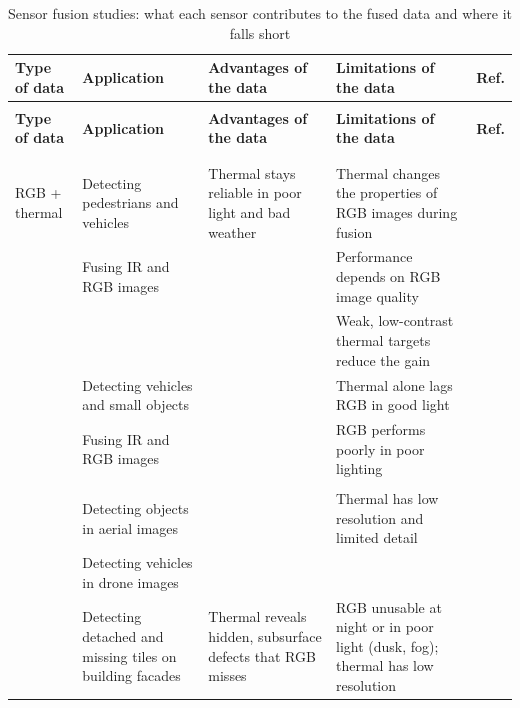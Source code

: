 {\scriptsize
\renewcommand{\arraystretch}{1.15}
\setlength{\tabcolsep}{3pt}
\begin{xltabular}{\textwidth}{>{\RaggedRight\arraybackslash}p{2.1cm}>{\RaggedRight\arraybackslash}p{2.9cm}>{\RaggedRight\arraybackslash}X>{\RaggedRight\arraybackslash}Xp{0.95cm}}
\caption{Sensor fusion studies: what each sensor contributes to the fused data and where it falls short}\label{tab:fusion-data}\\
\toprule
\textbf{Type of data} & \textbf{Application} & \textbf{Advantages of the data} & \textbf{Limitations of the data} & \textbf{Ref.} \\
\midrule
\endfirsthead
{}\\
\toprule
\textbf{Type of data} & \textbf{Application} & \textbf{Advantages of the data} & \textbf{Limitations of the data} & \textbf{Ref.} \\
\midrule
\endhead
\midrule{}\\
\endfoot
\bottomrule
{}\\
\endlastfoot
RGB + thermal & Detecting pedestrians and vehicles & Thermal stays reliable in poor light and bad weather & Thermal changes the properties of RGB images during fusion & \citep{Lin2022} \\
 & Fusing IR and RGB images &  & Performance depends on RGB image quality & \citep{Xiao2026} \\
 &  &  & Weak, low-contrast thermal targets reduce the gain & \citep{Zhu2026} \\
 & Detecting vehicles and small objects &  & Thermal alone lags RGB in good light & \citep{Liu2025b} \\
 & Fusing IR and RGB images &  & RGB performs poorly in poor lighting & \citep{Lin2026} \\
 &  &  &  & \citep{Gao2026} \\
 & Detecting objects in aerial images &  & Thermal has low resolution and limited detail & \citep{Liu2025a} \\
 & Detecting vehicles in drone images &  &  & \citep{Tang2026} \\
 & Detecting detached and missing tiles on building facades & Thermal reveals hidden, subsurface defects that RGB misses & RGB unusable at night or in poor light (dusk, fog); thermal has low resolution & \citep{Yang2023} \\

\end{xltabular}}
